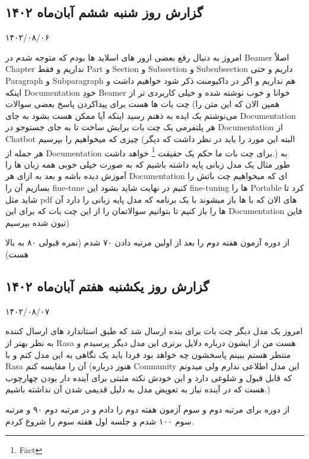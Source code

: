 \subsection{گزارش روز شنبه ششم آبان‌ماه ۱۴۰۲}

۱۴۰۲/۰۸/۰۶

امروز به دنبال رفع بعضی ارور های اسلاید ها بودم که متوجه شدم در Beamer اصلاً Chapter نداریم و فقط Part و Section و Subsection و Subsubsection داریم و حتی Paragraph و Subparagraph هم نداریم و اگر در داکیومنت ذکر شود  خواهیم داشت و اینکه Documentation خودِ Beamer خوانا و خوب نوشته شده و خیلی کاربردی تر از چت بات ها هست برای پیداکردن پاسخ بعضی سوالات (همین الان که این متن را می‌نوشتم یک ایده به ذهنم رسید اینکه آیا ممکن هست بشود به جای Documentation هر پلتفرمی یک چت بات برایش ساخت تا به جای جستوجو در Documentation از Chatbot چیزی که میخواهیم را بپرسیم (البته این مورد را باید در نظر داشت که دیگر هر جمله از Documentation برای چت بات ما حکم یک حقیقت \footnote{Fact} خواهد داشت.) به طور مثال یک مدل زبانی پایه داشته باشیم که به صورت خیلی خوبی همه زبان ها را آموزش دیده باشه و بعد به ازای هر Documentation ای که میخواهیم چت باتش را بسازیم آن را fine-tune کنیم در نهایت شاید بشود این fine-tuning ها را Portable کرد تا شاید مثل pdf های الان که با  ها باز میشوند با یک برنامه که مدل پایه زبانی را دارد آن ها را باز کنیم تا بتوانیم سوالاتمان را از این چت بات که برای این Documentation فاین تیون شده بپرسیم)

از دوره  آزمون هفته دوم را بعد از اولین مرتبه دادن ۷۰ شدم (نمره قبولی ۸۰ به بالا هست)


\subsection{گزارش روز یکشنبه هفتم آبان‌ماه ۱۴۰۲}

۱۴۰۲/۰۸/۰۷

امروز یک مدل دیگر چت بات برای بنده ارسال شد که طبق استاندارد های ارسال کننده به نظر بهتر از Rasa هست من از ایشون درباره دلایل برتری این مدل دیگر پرسیدم و منتظر هستم ببینم پاسخشون چه خواهد بود فردا باید یک نگاهی به این مدل کنم و با Rasa آن را مقایسه کنم (هنوز درباره Community این مدل اطلاعی ندارم ولی میدونم که  قابل قبول و شلوغی دارد و این خودش نکته مثبتی برای آینده دار بودن چهارچوب هست که در آینده نیاز به تعویض مدل به دلیل قدیمی شدن آن نداشته باشیم.)

از دوره  برای مرتبه دوم و سوم آزمون هفته دوم را دادم و در مرتبه دوم ۹۰ و مرتبه سوم ۱۰۰ شدم و جلسه اول هفته سوم را شروع کردم.

